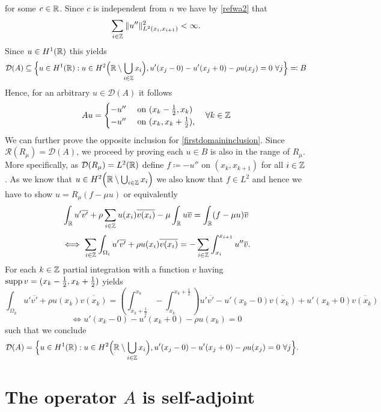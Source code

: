 for some $c \in \mathbb{R}$. Since $c$ is independent from $n$ we have by \eqref{refwa2} that
	\[ \sum_{i \in \mathbb{Z}} \|u''\|^{2}_{L^{2}(x_{i}, x_{i+1})} < \infty. \]
Since $u \in H^{1}(\mathbb{R})$ this yields
	\[ \mathcal{D}(A) \subseteq \Big\{ u \in H^{1}(\mathbb{R}): u \in H^{2}\Big(\mathbb{R} \setminus \bigcup_{i \in \mathbb{Z}} x_{i} \Big), u'(x_{j} - 0) - u'(x_{j} + 0) - \rho u(x_{j}) = 0 ~\forall j \Big\} \eqqcolon B \label{firstdomaininclusion} \] %
Hence, for an arbitrary $u \in \mathcal{D}(A)$ it follows
	\[ A u = \begin{cases}
					- u'' & \text{ on } (x_{k} - \frac{1}{2}, x_{k}) \\
					- u'' & \text{ on } (x_{k}, x_{k} + \frac{1}{2}),
			 \end{cases} \quad \forall k \in \mathbb{Z} \]
We can further prove the opposite inclusion for \eqref{firstdomaininclusion}. Since $\mathcal{R}(R_{\mu}) = \mathcal{D}(A)$, we proceed by proving each $u \in B$ is also in the range of $R_{\mu}$. More specifically, as $\mathcal{D}(R_{\mu}) = L^{2}(\mathbb{R})$ define $f \coloneqq - u''$ on $(x_{k}, x_{k + 1})$ for all $i \in \mathbb{Z}$. As we know that $u \in H^{2}\Big(\mathbb{R} \setminus \bigcup_{i \in \mathbb{Z}} x_{i} \Big)$ we also know that $f \in L^{2}$ and hence we have to show $u = R_{\mu}(f - \mu u)$ or equivalently
	\[ \int_{\mathbb{R}} u' \overline{v'} + \rho \sum_{i \in \mathbb{Z}} u(x_{i}) \overline{v(x_{i})} - \mu \int_{\mathbb{R}} u \overline{v}= \int_{\mathbb{R}}(f-\mu u) \overline{v} \]
	\[ \iff \sum_{i \in \mathbb{Z}} \int_{\Omega_{i}} u' \overline{v'} + \rho u(x_{i}) \overline{v(x_{i})} = - \sum_{i \in \mathbb{Z}} \int_{x_{i}}^{x_{i+1}} u'' \overline{v}. \]
	For each $k \in \mathbb{Z}$ partial integration with a function $v$ having $\operatorname{supp} v = (x_{k} - \frac{1}{2}, x_{k} + \frac{1}{2})$ yields
	\[ \int_{\Omega_{k}} u' \overline{v'} + \rho u(x_{k}) \overline{v(x_{k})} =\left( \int_{x_{k} + \frac{1}{2}}^{x_{k}} - \int_{x_{k}}^{x_{k} +\frac{1}{2}} \right) u' \overline{v'} - u'(x_{k}-0) \overline{v(x_{k})}  + u'(x_{k}+0) \overline{v(x_{k})}  \]
	\[ \iff u'(x_{k}-0) - u'(x_{k}+0) - \rho u(x_{k}) = 0 \] %
	such that we conclude
	\begin{align*}
		\mathcal{D}(A) & = \Big\{ u \in H^{1}(\mathbb{R}): u \in H^{2}\Big(\mathbb{R} \setminus \bigcup_{i \in \mathbb{Z}} x_{i} \Big), u'(x_{j} - 0) - u'(x_{j} + 0) - \rho u(x_{j}) = 0 ~\forall j \Big\}.
	\end{align*}

\section{The operator $A$ is self-adjoint}

